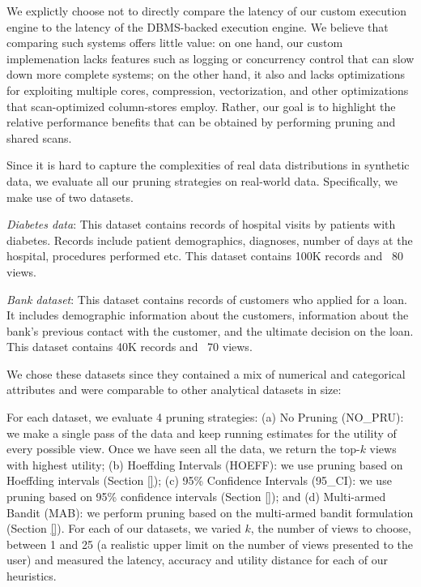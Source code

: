 We explictly choose not to directly compare the latency
of our custom execution engine to the latency of the DBMS-backed execution
engine. We believe that comparing such systems offers little value:
on one hand, our custom implemenation lacks features such as logging or concurrency control
that can slow down more complete systems; on the other hand, it also and lacks optimizations
for exploiting multiple cores, compression, vectorization, and other optimizations
that scan-optimized column-stores employ.  Rather, our goal
is to highlight the relative performance benefits that can
be obtained by performing pruning and shared scans.

Since it is hard to capture the complexities of real data distributions in synthetic data, we
evaluate all our pruning strategies on real-world data. 
Specifically, we make use of two datasets.
\begin{compactitem}
\item {\it Diabetes data}\cite{}: This dataset contains records of hospital
visits by patients with diabetes. Records include patient demographics,
diagnoses, number of days at the hospital, procedures performed etc. 
This dataset contains 100K records and ~80 views.
\item {\it Bank dataset}\cite{}: This dataset contains records of customers who
applied for a loan. It includes demographic information about the
customers, information about the bank's previous contact with the customer, and
the ultimate decision on the loan.
This dataset contains 40K records and ~70 views.
\end{compactitem}
We chose these datasets since they contained a mix of numerical and categorical
attributes and were comparable to other analytical datasets in size:


For each dataset, we evaluate 4 pruning strategies:
(a) No Pruning (NO\_PRU): we make a single pass of the data and keep running
estimates for the utility of every possible view. Once we have seen all the
data, we return the top-$k$ views with highest utility; (b) Hoeffding Intervals
(HOEFF):
we use pruning based on Hoeffding intervals (Section \ref{}); (c) 95\%
Confidence Intervals (95\_CI): we use pruning based on 95\% confidence intervals
(Section \ref{}); and (d) Multi-armed Bandit (MAB): we perform pruning based on
the multi-armed bandit formulation (Section \ref{}).
For each of our datasets, we varied $k$, the number of views to choose, between
1 and 25 (a realistic upper limit on the number of views presented to the user)
and measured the latency, accuracy and utility distance for each of our
heuristics.

